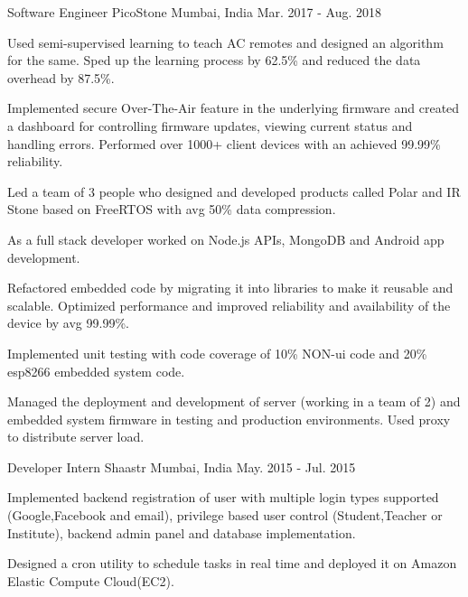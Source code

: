 

\begin{cventries}

	\cventry
	{Software Engineer} %
	{PicoStone} %
	{Mumbai, India} %
	{Mar. 2017 - Aug. 2018} %
	{ \begin{cvitems} %
	\item{Used semi-supervised learning to teach AC remotes and designed an algorithm for the same. Sped up the learning process by 62.5\% and reduced the data overhead by 87.5\%.} %
      \item {Implemented secure Over-The-Air feature in the underlying firmware and created a dashboard for controlling firmware updates, viewing current status and handling errors. Performed over 1000+ client devices with an achieved 99.99\% reliability.}
      \item {Led a team of 3 people who designed and developed products called Polar and IR Stone based on FreeRTOS with avg 50\% data compression.}  %
      \item {As a full stack developer worked on Node.js APIs, MongoDB and Android app development.}    
      \item {Refactored embedded code by migrating it into libraries to make it reusable and scalable. Optimized performance and improved reliability and availability of the device by avg 99.99\%.}  %
      \item {Implemented unit testing with code coverage of 10\% NON-ui code and 20\% esp8266 embedded system code.}
      \item {Managed the deployment and development of server (working in a team of 2) and embedded system firmware in testing and production environments. Used proxy to distribute server load.}
     \end{cvitems}
  }


	\cventry
	{Developer Intern} %
	{Shaastr } %
	{Mumbai, India} %
	{May. 2015 - Jul. 2015} %
	{
		\begin{cvitems} %
			\item {Implemented backend registration of user with multiple login types supported (Google,Facebook and email), privilege based user control (Student,Teacher or Institute), backend admin panel and database implementation.}
			\item {Designed a cron utility to schedule tasks in real time and deployed it on Amazon Elastic Compute Cloud(EC2).}
		\end{cvitems}
	}

\end{cventries}